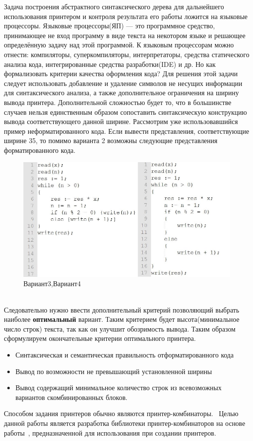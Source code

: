 \documentclass{matmex-diploma}
\begin{document}
Задача построения абстрактного синтаксического дерева для дальнейшего использования принтером и контроля результата его работы ложится на языковые процессоры. Языковые процессоры(ЯП) — это программное средство, принимающее не вход программу в виде текста на некотором языке и решающее определённую задачу над этой программой. К языковым процессорам можно отнести: компиляторы, суперкомпиляторы, интерпретаторы, средства статического анализа кода, интегрированные средства разработки(IDE) и др.
Но как формализовать критерии качества оформления кода?  Для решения этой задачи следует использовать добавление и удаление символов не несущих информации для синтаксического анализа, а также дополнительное ограничения на ширину вывода принтера.
Дополнительной сложностью будет то, что в большинстве случаев нельзя единственным образом сопоставить синтаксическую конструкцию вывода соответствующего данной ширине. Рассмотрим уже использовавшийся пример неформатированного кода. Если вывести представления, соответствующие ширине 35, то помимо варианта 2 возможны следующие представления форматированного кода.
\begin{figure}[h]
    \centering
    \includegraphics[scale=0.6]{Images/image08.png}
    \caption{Вариант3,Вариант4}
\end{figure}
\\Следовательно нужно ввести дополнительный критерий позволяющий выбрать наиболее \textbf{оптимальный} вариант. Таким критерием будет высота(минимальное число строк) текста, так как он улучшит обозримость вывода. 
Таким образом сформулируем окончательные критерии оптимального принтера.
\begin{itemize}
    \item Синтаксическая и семантическая правильность отформатированного кода
    \item Вывод по возможности не превышающий установленной ширины
    \item Вывод содержащий минимальное количество строк из всевозможных вариантов скомбинированных блоков.
\end{itemize}
Способом задания принтеров обычно являются принтер-комбинаторы.~\cite{podkopaevD, podkopaevR, printComb}
Целью данной работы является разработка библиотеки принтер-комбинаторов на основе работы~\cite{podkopaevD}, предназначенной для использования при создании принтеров.
\end{document}
